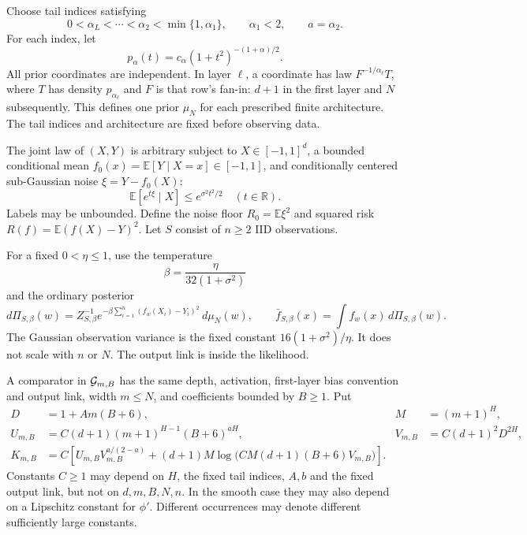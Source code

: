 \documentclass[11pt]{article}
\theoremstyle{remark}\newtheorem{remark}[theorem]{Remark}
\newcommand{\E}{\mathbb E}\newcommand{\R}{\mathbb R}\newcommand{\Pp}{\mathbb P}
\begin{document}
Choose tail indices satisfying
\begin{equation}
 0<\alpha_L<\cdots<\alpha_2<\min\{1,\alpha_1\},
 \qquad \alpha_1<2,\qquad a=\alpha_2.
 \label{eq:tail-indices}
\end{equation}
For each index, let
\[
 p_\alpha(t)=c_\alpha(1+t^2)^{-(1+\alpha)/2}.
\]
All prior coordinates are independent. In layer $\ell$, a coordinate has law $F^{-1/\alpha_\ell}T$, where $T$ has density $p_{\alpha_\ell}$ and $F$ is that row's fan-in: $d+1$ in the first layer and $N$ subsequently. This defines one prior $\mu_N$ for each prescribed finite architecture. The tail indices and architecture are fixed before observing data.

The joint law of $(X,Y)$ is arbitrary subject to $X\in[-1,1]^d$, a bounded conditional mean $f_0(x)=\E[Y\mid X=x]\in[-1,1]$, and conditionally centered sub-Gaussian noise $\xi=Y-f_0(X)$:
\begin{equation}
 \E[e^{t\xi}\mid X]\le e^{\sigma^2t^2/2}\quad(t\in\R).
 \label{eq:noise-assumption}
\end{equation}
Labels may be unbounded. Define the noise floor $R_0=\E\xi^2$ and squared risk $R(f)=\E(f(X)-Y)^2$. Let $S$ consist of $n\ge2$ IID observations.

For a fixed $0<\eta\le1$, use the temperature
\[
 \beta=\frac{\eta}{32(1+\sigma^2)}
\]
and the ordinary posterior
\begin{equation}
 d\Pi_{S,\beta}(w)=Z_{S,\beta}^{-1}
 e^{-\beta\sum_{i=1}^n(f_w(X_i)-Y_i)^2}\,d\mu_N(w),
 \qquad \bar f_{S,\beta}(x)=\int f_w(x)\,d\Pi_{S,\beta}(w).
 \label{eq:posterior}
\end{equation}
The Gaussian observation variance is the fixed constant $16(1+\sigma^2)/\eta$. It does not scale with $n$ or $N$. The output link is inside the likelihood.

A comparator in $\mathcal G_{m,B}$ has the same depth, activation, first-layer bias convention and output link, width $m\le N$, and coefficients bounded by $B\ge1$. Put
\begin{align}
 D&=1+Am(B+6),& M&=(m+1)^H,\\
 U_{m,B}&=C(d+1)(m+1)^{H-1}(B+6)^{aH},&
 V_{m,B}&=C(d+1)^2D^{2H},\\
 K_{m,B}&=C\left[
 U_{m,B}V_{m,B}^{a/(2-a)}
 +(d+1)M\log\!\big(CM(d+1)(B+6)V_{m,B}\big)
 \right].
 \label{eq:resources}
\end{align}
Constants $C\ge1$ may depend on $H$, the fixed tail indices, $A,b$ and the fixed output link, but not on $d,m,B,N,n$. In the smooth case they may also depend on a Lipschitz constant for $\phi'$. Different occurrences may denote different sufficiently large constants.
\end{document}
